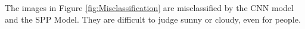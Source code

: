 The images in Figure \ref{fig:Misclassification} are misclassified by the CNN model and the SPP Model. They are difficult to judge sunny or cloudy, even for people.
\graphicspath{ {./Figures/} }
\begin{figure}[htb]
    \centering
\end{figure}
